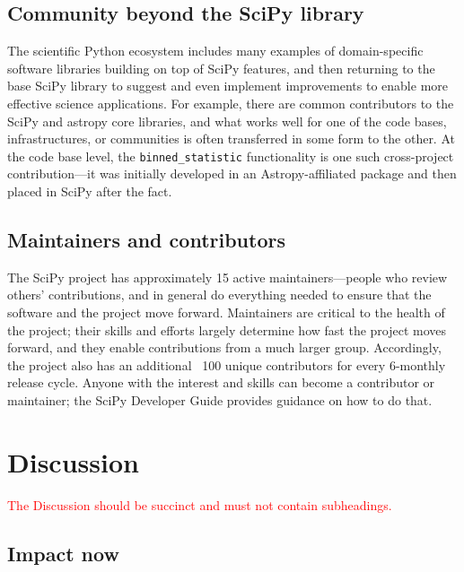 \documentclass[fleqn,10pt]{wlscirep}
\newcommand{\fixme}[1]{\textcolor{red}{{#1}}}
\begin{document}
\subsection*{Community beyond the SciPy library}

The scientific Python ecosystem includes many examples
of domain-specific software libraries building on top
of SciPy features, and then returning to the base SciPy library
to suggest and even implement improvements to enable
more effective science applications. For example, there
are common contributors to the SciPy and astropy core
libraries\cite{astropy-2018}, and what works well for 
one of the code bases, infrastructures, or communities 
is often transferred in some form to the other. At the code
base level, the \texttt{binned\_statistic} functionality
is one such cross-project contribution---it was initially
developed in an Astropy-affiliated package
and then placed in SciPy after the fact.

\subsection*{Maintainers and contributors}

The SciPy project has approximately 15 active maintainers---people who review
others' contributions, and in general do everything needed to ensure that the
software and the project move forward. Maintainers are critical to the health
of the project\cite{eghbal2016}; their skills and efforts largely determine how
fast the project moves forward, and they enable contributions from a much
larger group. Accordingly, the project also has an additional ~100 unique
contributors for every 6-monthly release cycle. Anyone with the interest and
skills can become a contributor or maintainer; the SciPy Developer Guide
provides guidance on how to do that.

\section*{Discussion}

\fixme{The Discussion should be succinct and must not contain subheadings.}

\subsection*{Impact now}

\end{document}
